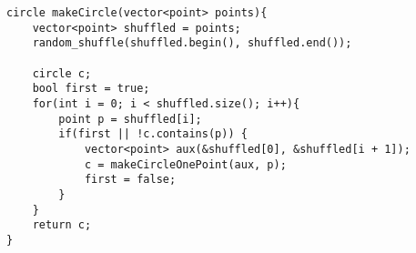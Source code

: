 \begin{multicols}{2}
\begin{lstlisting}
circle makeCircle(vector<point> points){
	vector<point> shuffled = points;
	random_shuffle(shuffled.begin(), shuffled.end());
	
	circle c;
	bool first = true;
	for(int i = 0; i < shuffled.size(); i++){
		point p = shuffled[i];
		if(first || !c.contains(p))	{
			vector<point> aux(&shuffled[0], &shuffled[i + 1]);
			c = makeCircleOnePoint(aux, p);
			first = false;
		}
	}
	return c;
}
	\end{lstlisting}
\end{multicols}